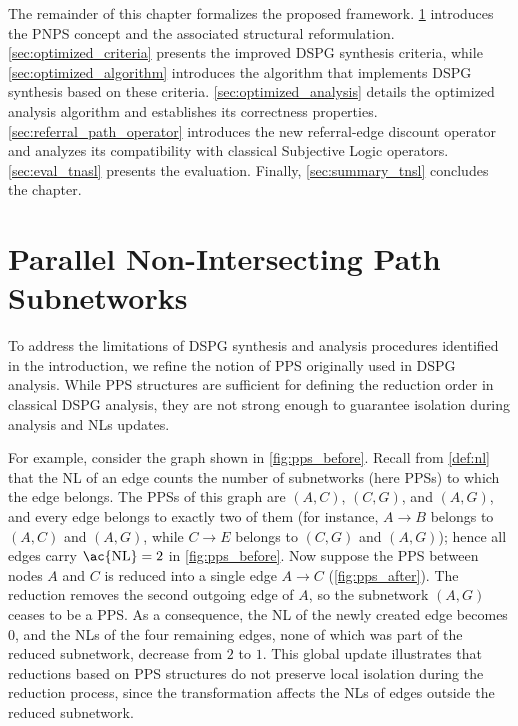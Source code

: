 The remainder of this chapter formalizes the proposed framework. \cref{sec:pnps} introduces the \ac{PNPS} concept and the associated structural reformulation.  \cref{sec:optimized_criteria} presents the improved \ac{DSPG} synthesis criteria, while \cref{sec:optimized_algorithm} introduces the algorithm that implements DSPG synthesis based on these criteria. \cref{sec:optimized_analysis} details the optimized analysis algorithm and establishes its correctness properties. \cref{sec:referral_path_operator} introduces the new referral-edge discount operator and analyzes its compatibility with classical Subjective Logic operators. \cref{sec:eval_tnasl} presents the evaluation. Finally, \cref{sec:summary_tnsl} concludes the chapter.

\section{Parallel Non-Intersecting Path Subnetworks}
\label{sec:pnps}

To address the limitations of \ac{DSPG} synthesis and analysis procedures identified in the introduction, we refine the notion of \ac{PPS} originally used in \ac{DSPG} analysis. While \ac{PPS} structures are sufficient for defining the reduction order in classical \ac{DSPG} analysis, they are not strong enough to guarantee isolation during analysis and \acp{NL} updates.

For example, consider the graph shown in \cref{fig:pps_before}. Recall from \cref{def:nl} that the \ac{NL} of an edge counts the number of subnetworks (here \acp{PPS}) to which the edge belongs. The \acp{PPS} of this graph are $(A,C)$, $(C,G)$, and $(A,G)$, and every edge belongs to exactly two of them (for instance, $A \to B$ belongs to $(A,C)$ and $(A,G)$, while $C \to E$ belongs to $(C,G)$ and $(A,G)$); hence all edges carry $\text{\ac{NL}} = 2$ in \cref{fig:pps_before}. Now suppose the \ac{PPS} between nodes \(A\) and \(C\) is reduced into a single edge \(A\to C\) (\cref{fig:pps_after}). The reduction removes the second outgoing edge of $A$, so the subnetwork $(A,G)$ ceases to be a \ac{PPS}. As a consequence, the \ac{NL} of the newly created edge becomes \(0\), and the \acp{NL} of the four remaining edges, none of which was part of the reduced subnetwork, decrease from $2$ to $1$. This global update illustrates that reductions based on \ac{PPS} structures do not preserve local isolation during the reduction process, since the transformation affects the \acp{NL} of edges outside the reduced subnetwork.

